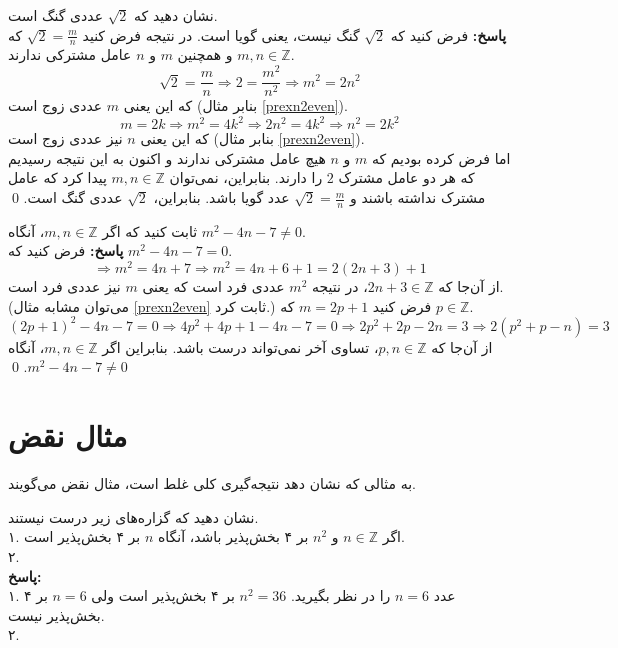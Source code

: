 \begin{example}
	نشان دهید که
	$\sqrt{2}$
	عددی گنگ است. \\
	\textbf{پاسخ:}
	فرض کنید که
	$\sqrt{2}$
	گنگ نیست، یعنی گویا است. در نتیجه فرض کنید
	$\sqrt{2}=\frac{m}{n}$
	که
	$m,n \in \mathbb{Z}$
	و همچنین $m$ و $n$ عامل مشترکی ندارند.
	$$\sqrt{2}=\frac{m}{n} \Rightarrow 2=\frac{m^2}{n^2} \Rightarrow m^2=2n^2$$
	که این یعنی $m$ عددی زوج است (بنابر مثال
	\ref{prexn2even}).
	$$m=2k \Rightarrow m^2=4k^2 \Rightarrow 2n^2=4k^2 \Rightarrow n^2=2k^2$$
	که این یعنی $n$ نیز عددی زوج است (بنابر مثال
	\ref{prexn2even}). \\
	اما فرض کرده بودیم که $m$ و $n$ هیچ عامل مشترکی ندارند و اکنون به این نتیجه رسیدیم که هر دو عامل مشترک $2$ را دارند. بنابراین، نمی‌توان
	$m,n \in \mathbb{Z}$
	پیدا کرد که عامل مشترک نداشته باشند و 
	$\sqrt{2}=\frac{m}{n}$
	عدد گویا باشد. بنابراین،
	$\sqrt{2}$
	عددی گنگ است.
	\qed
\end{example}

\begin{example}
	ثابت کنید که اگر
	$m,n \in \mathbb{Z}$،
	آنگاه
	$m^2-4n-7 \neq 0$.
	\\ \textbf{پاسخ:}
	فرض کنید که
	$m^2-4n-7=0$.
	$$\Rightarrow m^2=4n+7 \Rightarrow m^2=4n+6+1=2(2n+3)+1$$
	از آن‌جا که
	$2n+3 \in \mathbb{Z}$،
	در نتیجه
	$m^2$
	عددی فرد است که یعنی $m$ نیز عددی فرد است. (می‌توان مشابه مثال
	\ref{prexn2even}
	ثابت کرد.) فرض کنید
	$m=2p+1$
	که
	$p \in \mathbb{Z}$.
	$$(2p+1)^2-4n-7=0 \Rightarrow 4p^2+4p+1-4n-7=0 \Rightarrow 2p^2+2p-2n=3 \Rightarrow2(p^2+p-n)=3$$
	از آن‌جا که
	$p,n \in \mathbb{Z}$،
	تساوی آخر نمی‌تواند درست باشد. بنابراین اگر
	$m,n \in \mathbb{Z}$،
	آنگاه
	$m^2-4n-7 \neq 0$.
	\qed
\end{example}

\section{مثال نقض}
به مثالی که نشان دهد نتیجه‌گیری کلی غلط است، مثال نقض می‌گویند.
\begin{example}
	نشان دهید که گزاره‌های زیر درست نیستند. \\
	۱. اگر
	$n \in \mathbb{Z}$
	و
	$n^2$
	بر ۴ بخش‌پذیر باشد، آنگاه $n$ بر ۴ بخش‌پذیر است. \\
	۲. 
	\\ \textbf{پاسخ:} \\
	۱. عدد
	$n=6$
	را در نظر بگیرید.
	$n^2=36$
	بر ۴ بخش‌پذیر است ولی
	$n=6$
	بر ۴ بخش‌پذیر نیست. \\
	۲.
\end{example}

